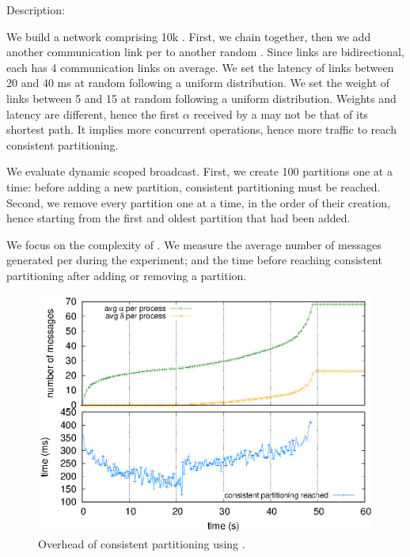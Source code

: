 \begin{asparadesc}
\item [Description:]

We build a network comprising 10k \processes. First, we chain
\processes together, then we add another communication link per
\process to another random \process. Since links are bidirectional,
each \process has 4 communication links on average. We set the latency
of links between 20 and 40 ms at random following a uniform
distribution. We set the weight of links between 5 and 15 at random
following a uniform distribution. Weights and latency are different,
hence the first $\alpha$ received by a \process may not be that of its
shortest path. It implies more concurrent operations, hence more
traffic to reach consistent partitioning.

\noindent We evaluate dynamic scoped broadcast. First, we create 100
partitions one at a time: before adding a new partition, consistent
partitioning must be reached. Second, we remove every partition one at
a time, in the order of their creation, hence starting from the first
and oldest partition that had been added.

\noindent We focus on the complexity of \NAME. We measure the average
number of messages generated per \process during the experiment; and
the time before reaching consistent partitioning after adding or
removing a partition.

\begin{figure}
  \centering\includegraphics[width=0.99\columnwidth]{img/as_cast_complexity.eps}
  \caption{\label{fig:complexity}Overhead of consistent partitioning
    using \NAME.}
\end{figure}


\end{asparadesc}
